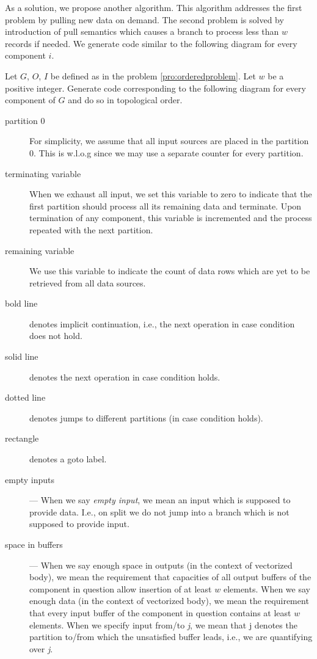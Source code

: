 As a solution, we propose another algorithm. This algorithm addresses the first problem by pulling new data on demand. The second problem is solved by introduction of pull semantics which causes a branch to process less than $w$ records if needed. We generate code similar to the following diagram for every component $i$.

  Let $G$, $O$, $I$ be defined as in the problem \ref{pro:orderedproblem}. Let $w$ be a positive integer. Generate code corresponding to the following diagram for every component of $G$ and do so in topological order.
\begin{description}
 \item[partition 0] For simplicity, we assume that all input sources are placed in the partition 0. This is w.l.o.g since we may use a separate counter for every partition. 
  \item[terminating variable] When we exhaust all input, we set this variable to zero to indicate that the first partition should process all its remaining data and terminate. Upon termination of any component, this variable is incremented and the process repeated with the next partition.
  \item[remaining variable] We use this variable to indicate the count of data rows which are yet to be retrieved from all data sources. 
  \item[bold line] denotes implicit continuation, i.e., the next operation in case condition does not hold. 
  \item[solid line] denotes the next operation in case condition holds.
  \item[dotted line] denotes jumps to different partitions (in case condition holds).
  \item[rectangle] denotes a goto label.
 \item[empty inputs] --- When we say \emph{empty input}, we mean an input which is supposed to provide data. I.e., on split we do not jump into a branch which is not supposed to provide input.
  \item[space in buffers] --- When we say enough space in outputs (in the context of vectorized body), we mean the requirement that capacities of all output buffers of the component in question allow insertion of at least $w$ elements. When we say enough data (in the context of vectorized body), we mean the requirement that every input buffer of the component in question contains at least $w$ elements. When we specify input from/to \emph{j}, we mean that j denotes the partition to/from which the unsatisfied buffer leads, i.e., we are quantifying over \emph{j}.

\end{description}
